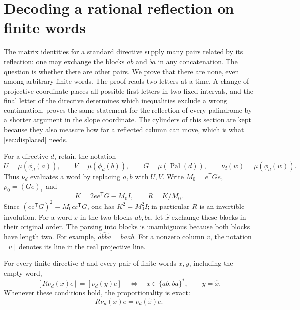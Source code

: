 \section{Decoding a rational reflection on finite words}
\label{sec:decoder}

The matrix identities for a standard directive supply many pairs related
by its reflection: one may exchange the blocks $ab$ and $ba$ in any
concatenation. The question is whether there are other pairs. We prove
that there are none, even among arbitrary finite words. The proof reads
two letters at a time. A change of projective coordinate places all
possible first letters in two fixed intervals, and the final letter of
the directive determines which inequalities exclude a wrong continuation.
 proves the same statement for the reflection of
every palindrome by a shorter argument in the slope coordinate. The cylinders
of this section are kept because they also measure how far a reflected column
can move, which is what \cref{sec:displaced} needs.

For a directive $d$, retain the notation
$$
 U=\mu(\phi_d(a)),\qquad V=\mu(\phi_d(b)),\qquad
 G=\mu(\operatorname{Pal}(d)),\qquad
 \nu_d(w)=\mu(\phi_d(w)).
$$
Thus $\nu_d$ evaluates a word by replacing $a,b$ with $U,V$.
Write $M_0=e^{\mathsf T}Ge$, $\rho_0=(Ge)_1$ and
$$
 K=2ee^{\mathsf T}G-M_0I,\qquad R=K/M_0.
$$
Since $(ee^{\mathsf T}G)^2=M_0ee^{\mathsf T}G$, one has
$K^2=M_0^2I$; in particular $R$ is an invertible involution.
For a word $x$ in the two blocks $ab,ba$, let $\widehat{x}$ exchange
these blocks in their original order. The parsing into blocks is
unambiguous because both blocks have length two. For example,
$\widehat{abba}=baab$. For a nonzero column $v$, the notation $[v]$
denotes its line in the real projective line.

\begin{theorem}\label{thm:word-decoder}
For every finite directive $d$ and every pair of finite words $x,y$,
including the empty word,
\begin{equation}\label{eq:decoder-projective}
 [R\nu_d(x)e]=[\nu_d(y)e]
 \quad\Longleftrightarrow\quad
 x\in\{ab,ba\}^*,\qquad y=\widehat{x}.
\end{equation}
Whenever these conditions hold, the proportionality is exact:
\begin{equation}\label{eq:decoder-exact}
 R\nu_d(x)e=\nu_d(\widehat{x})e.
\end{equation}
\end{theorem}

